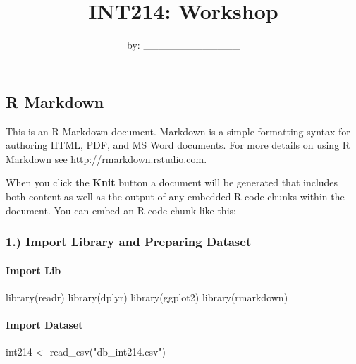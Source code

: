 \documentclass[
]{article}
\title{INT214: Workshop}
\author{by: \_\_\_\_\_\_\_\_\_\_\_\_\_}
\date{}
\newenvironment{Shaded}{\begin{snugshade}}{\end{snugshade}}
\newcommand{\FunctionTok}[1]{\textcolor[rgb]{0.00,0.00,0.00}{#1}}
\newcommand{\NormalTok}[1]{#1}
\newcommand{\OtherTok}[1]{\textcolor[rgb]{0.56,0.35,0.01}{#1}}
\newcommand{\StringTok}[1]{\textcolor[rgb]{0.31,0.60,0.02}{#1}}
\begin{document}
\maketitle

\hypertarget{r-markdown}{%
\subsection{R Markdown}\label{r-markdown}}

This is an R Markdown document. Markdown is a simple formatting syntax
for authoring HTML, PDF, and MS Word documents. For more details on
using R Markdown see \url{http://rmarkdown.rstudio.com}.

When you click the \textbf{Knit} button a document will be generated
that includes both content as well as the output of any embedded R code
chunks within the document. You can embed an R code chunk like this:

\hypertarget{import-library-and-preparing-dataset}{%
\subsubsection{1.) Import Library and Preparing
Dataset}\label{import-library-and-preparing-dataset}}

\hypertarget{import-lib}{%
\paragraph{Import Lib}\label{import-lib}}

\begin{Shaded}
\begin{Highlighting}[]
\FunctionTok{library}\NormalTok{(readr)}
\FunctionTok{library}\NormalTok{(dplyr)}
\FunctionTok{library}\NormalTok{(ggplot2)}
\FunctionTok{library}\NormalTok{(rmarkdown)}
\end{Highlighting}
\end{Shaded}

\hypertarget{import-dataset}{%
\paragraph{Import Dataset}\label{import-dataset}}

\begin{Shaded}
\begin{Highlighting}[]
\NormalTok{int214 }\OtherTok{\textless{}{-}} \FunctionTok{read\_csv}\NormalTok{(}\StringTok{"db\_int214.csv"}\NormalTok{)}
\end{Highlighting}
\end{Shaded}
\end{document}
